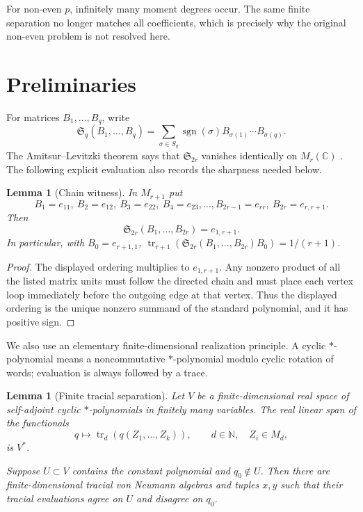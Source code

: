 \documentclass[11pt]{article}
\newtheorem{lemma}[theorem]{Lemma}
\theoremstyle{remark}
\newcommand{\tr}{\operatorname{tr}}
\newcommand{\C}{\mathbb C}
\newcommand{\Nn}{\mathbb N}
\newcommand{\Spol}{\mathfrak S}
\begin{document}
For non-even $p$, infinitely many moment degrees occur.  The same finite
separation no longer matches all coefficients, which is precisely why the
original non-even problem is not resolved here.

\section{Preliminaries}

For matrices $B_1,\ldots,B_q$, write
\[
 \Spol_q(B_1,\ldots,B_q)
 =\sum_{\sigma\in S_q}\operatorname{sgn}(\sigma)
   B_{\sigma(1)}\cdots B_{\sigma(q)}.
\]
The Amitsur--Levitzki theorem says that $\Spol_{2r}$ vanishes identically on
$M_r(\C)$ \cite{AL}.  The following explicit evaluation also records the
sharpness needed below.

\begin{lemma}[Chain witness]\label{lem:chain}
In $M_{r+1}$ put
\[
 B_1=e_{11},\ B_2=e_{12},\ B_3=e_{22},\ B_4=e_{23},\ldots,
 B_{2r-1}=e_{rr},\ B_{2r}=e_{r,r+1}.
\]
Then
\[
 \Spol_{2r}(B_1,\ldots,B_{2r})=e_{1,r+1}.
\]
In particular, with $B_0=e_{r+1,1}$,
$\tr_{r+1}(\Spol_{2r}(B_1,\ldots,B_{2r})B_0)=1/(r+1)$.
\end{lemma}

\begin{proof}
The displayed ordering multiplies to $e_{1,r+1}$.  Any nonzero product of
all the listed matrix units must follow the directed chain and must place
each vertex loop immediately before the outgoing edge at that vertex.  Thus
the displayed ordering is the unique nonzero summand of the standard
polynomial, and it has positive sign.
\end{proof}

We also use an elementary finite-dimensional realization principle.  A
cyclic $*$-polynomial means a noncommutative $*$-polynomial modulo cyclic
rotation of words; evaluation is always followed by a trace.

\begin{lemma}[Finite tracial separation]\label{lem:separation}
Let $V$ be a finite-dimensional real space of self-adjoint cyclic
$*$-polynomials in finitely many variables.  The real linear span of the
functionals
\[
 q\longmapsto \tr_d(q(Z_1,\ldots,Z_k)),
 \qquad d\in\Nn,\quad Z_i\in M_d,
\]
is $V^*$.

Suppose $U\subset V$ contains the constant polynomial and $q_0\notin U$.
Then there are finite-dimensional tracial von Neumann algebras and tuples
$x,y$ such that their tracial evaluations agree on $U$ and disagree on
$q_0$.
\end{lemma}
\end{document}

